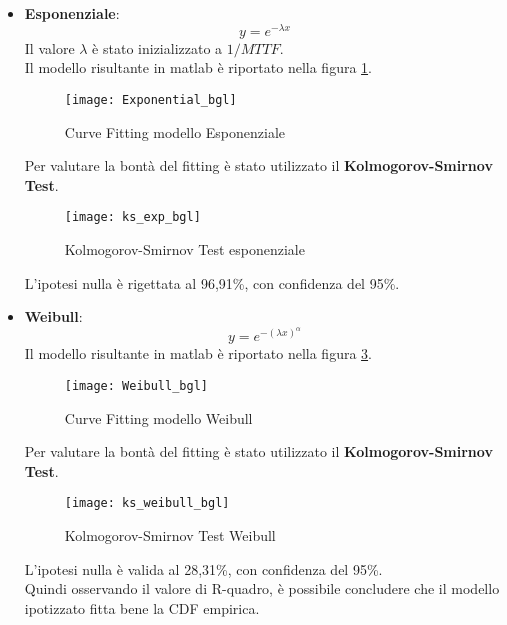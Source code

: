 \begin{itemize}
  \item \textbf{Esponenziale}:
  $$ y = e^{- \lambda  x} $$
  Il valore $\lambda$ è stato inizializzato a $1/MTTF$.\\
  Il modello risultante in matlab è riportato nella figura \ref{Exponential_bgl}.\\

  \begin{figure}[!htbp]
    \texttt{[image: Exponential\_bgl]}
    \caption{Curve Fitting modello Esponenziale}
    \label{Exponential_bgl}
  \end{figure}

  Per valutare la bontà del fitting è stato utilizzato il \textbf{Kolmogorov-Smirnov Test}.\\

  \begin{figure}[!htbp]
    \centering
    \texttt{[image: ks\_exp\_bgl]}
    \caption{Kolmogorov-Smirnov Test esponenziale}
    \label{ks_exp_bgl}
  \end{figure}

  L'ipotesi nulla è rigettata al 96,91\%, con confidenza del 95\%.

  \clearpage

  \item \textbf{Weibull}:
  $$ y = e^{- (\lambda x)^\alpha} $$
  Il modello risultante in matlab è riportato nella figura \ref{Weibull_bgl}.\\
  \begin{figure}[!htbp]
    \centering
    \texttt{[image: Weibull\_bgl]}
    \caption{Curve Fitting modello Weibull}
    \label{Weibull_bgl}
  \end{figure}

  Per valutare la bontà del fitting è stato utilizzato il \textbf{Kolmogorov-Smirnov Test}.\\

  \begin{figure}[!htbp]
    \centering
    \texttt{[image: ks\_weibull\_bgl]}
    \caption{Kolmogorov-Smirnov Test Weibull}
    \label{ks_weibull_bgl}
  \end{figure}

  L'ipotesi nulla è valida al 28,31\%, con confidenza del 95\%.\\
  Quindi osservando il valore di R-quadro, è possibile concludere che il
  modello ipotizzato fitta bene la CDF empirica.\\


\end{itemize}
